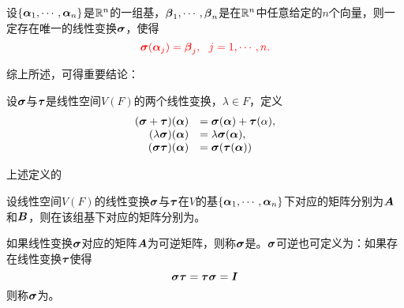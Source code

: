 \begin{frame}
  \begin{dingli}
    设$\{\boldsymbol{\alpha}_1,\cdots,\boldsymbol{\alpha}_n\}$是$\mathbb R^n$的一组基，$\boldsymbol{\beta}_1,\cdots,\boldsymbol{\beta}_n$是在$\mathbb R^n$中任意给定的$n$个向量，则一定存在唯一的线性变换$\boldsymbol{\sigma}$，使得
    $$
    \textcolor{red}{\boldsymbol{\sigma}(\boldsymbol{\alpha}_j)=\boldsymbol{\beta}_j, ~~ j=1,\cdots,n.}
    $$
  \end{dingli}
\end{frame}


\begin{frame}
  综上所述，可得重要结论：

\end{frame}


\begin{frame}
\begin{dingyi}
  设$\boldsymbol{\sigma}$与$\boldsymbol{\tau}$是线性空间$V(F)$的两个线性变换，$\lambda\in F$，定义
  $$
  \begin{array}{rl}
    (\boldsymbol{\sigma}+\boldsymbol{\tau})(\boldsymbol{\alpha})&=\boldsymbol{\sigma}(\boldsymbol{\alpha})+\boldsymbol{\tau}(\alpha),\\
    (\lambda\boldsymbol{\sigma})(\boldsymbol{\alpha})&=\lambda\boldsymbol{\sigma}(\boldsymbol{\alpha}), \\
    (\boldsymbol{\sigma}\boldsymbol{\tau})(\boldsymbol{\alpha})&=\boldsymbol{\sigma}(\boldsymbol{\tau}(\boldsymbol{\alpha}))
  \end{array}
  $$
\end{dingyi}
上述定义的

\end{frame}

\begin{frame}
  \begin{dingli}
    设线性空间$V(F)$的线性变换$\boldsymbol{\sigma}$与$\boldsymbol{\tau}$在$V$的基$\{\boldsymbol{\alpha}_1,\cdots,\boldsymbol{\alpha}_n\}$下对应的矩阵分别为$\boldsymbol{A}$和$\boldsymbol{B}$，则在该组基下对应的矩阵分别为。
  \end{dingli}
  \vspace{.1in} 

  \begin{dingyi}
    如果线性变换$\boldsymbol{\sigma}$对应的矩阵$\boldsymbol{A}$为可逆矩阵，则称$\boldsymbol{\sigma}$是。$\boldsymbol{\sigma}$可逆也可定义为：如果存在线性变换$\boldsymbol{\tau}$使得
    $$
    \boldsymbol{\sigma}\boldsymbol{\tau}=\boldsymbol{\tau}\boldsymbol{\sigma}=\boldsymbol{I}
    $$
    则称$\boldsymbol{\sigma}$为。
  \end{dingyi}
\end{frame}

